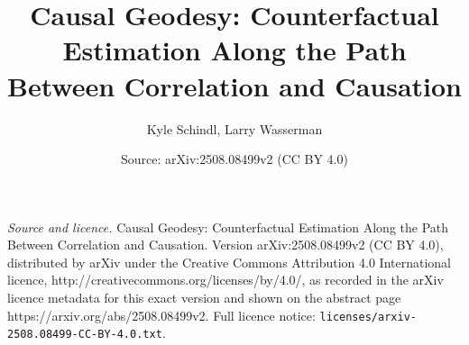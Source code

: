 \documentclass[10pt,a4paper]{amsart}
\title{\vspace*{-.4in} {Causal Geodesy: Counterfactual Estimation Along the Path Between Correlation and Causation}}
\author{Kyle Schindl, Larry Wasserman}
\date{Source: arXiv:2508.08499v2 (CC BY 4.0)}
\begin{document}
\maketitle

\noindent\emph{Source and licence.} \vspace*{-.4in} {Causal Geodesy: Counterfactual Estimation Along the Path Between Correlation and Causation}. Version arXiv:2508.08499v2 (CC BY 4.0), distributed by arXiv under the Creative Commons Attribution 4.0 International licence, http://creativecommons.org/licenses/by/4.0/, as recorded in the arXiv licence metadata for this exact version and shown on the abstract page https://arxiv.org/abs/2508.08499v2. Full licence notice: \texttt{licenses/arxiv-2508.08499-CC-BY-4.0.txt}.\par\smallskip
\end{document}
